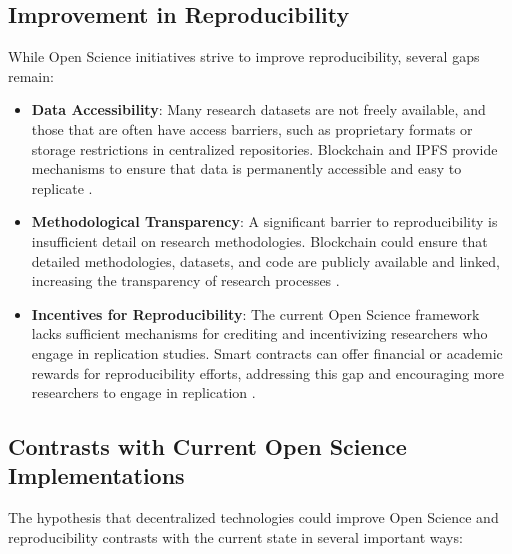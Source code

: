 \documentclass[final]{rc-book-2.14}
\begin{document}
\subsection{Improvement in Reproducibility}
While Open Science initiatives strive to improve reproducibility, several gaps remain:
\begin{itemize}
    \item \textbf{Data Accessibility}: Many research datasets are not freely available, and those that are often have access barriers, such as proprietary formats or storage restrictions in centralized repositories. Blockchain and IPFS provide mechanisms to ensure that data is permanently accessible and easy to replicate \cite{Leonelli2016}.
    \item \textbf{Methodological Transparency}: A significant barrier to reproducibility is insufficient detail on research methodologies. Blockchain could ensure that detailed methodologies, datasets, and code are publicly available and linked, increasing the transparency of research processes \cite{Piwowar2011}.
    \item \textbf{Incentives for Reproducibility}: The current Open Science framework lacks sufficient mechanisms for crediting and incentivizing researchers who engage in replication studies. Smart contracts can offer financial or academic rewards for reproducibility efforts, addressing this gap and encouraging more researchers to engage in replication \cite{Nosek2015}.
\end{itemize}

\subsection{Contrasts with Current Open Science Implementations}
The hypothesis that decentralized technologies could improve Open Science and reproducibility contrasts with the current state in several important ways:
\end{document}
